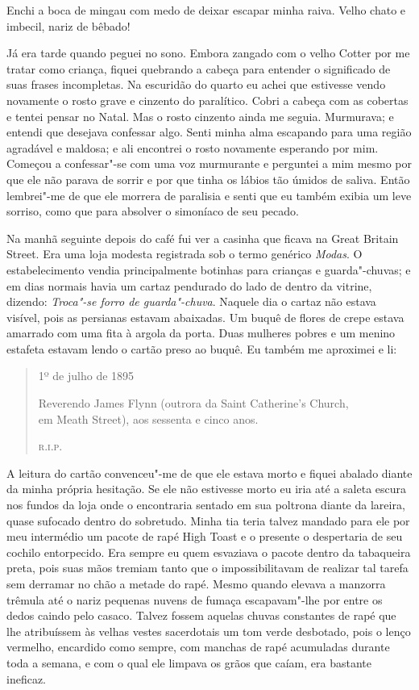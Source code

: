 Enchi a boca de mingau com medo de deixar escapar minha raiva.  Velho chato e
imbecil, nariz de bêbado!

Já era tarde quando peguei no sono.  Embora zangado com o velho Cotter por me
tratar como criança, fiquei quebrando a cabeça para entender o significado de
suas frases incompletas.  Na escuridão do quarto eu achei que estivesse vendo
novamente o rosto grave e cinzento do paralítico.  Cobri a cabeça com as
cobertas e tentei pensar no Natal.  Mas o rosto cinzento ainda me seguia.
Murmurava; e entendi que desejava confessar algo.  Senti minha alma escapando
para uma região agradável e maldosa; e ali encontrei o rosto novamente
esperando por mim.  Começou a confessar"-se com uma voz murmurante e perguntei a
mim mesmo por que ele não parava de sorrir e por que tinha os lábios tão úmidos
de saliva.  Então lembrei"-me de que ele morrera de paralisia e senti que eu
também exibia um leve sorriso, como que para absolver o simoníaco de seu
pecado.

Na manhã seguinte depois do café fui ver a casinha que ficava na Great Britain
Street.  Era uma loja modesta registrada sob o termo genérico \textit{Modas}.
O estabelecimento vendia principalmente botinhas para crianças e guarda"-chuvas;
e em dias normais havia um cartaz pendurado do lado de dentro da vitrine,
dizendo: \textit{Troca"-se forro de guarda"-chuva}.  Naquele dia o cartaz não
estava visível, pois as persianas estavam abaixadas.  Um buquê de flores de
crepe estava amarrado com uma fita à argola da porta.  Duas mulheres pobres e
um menino estafeta estavam lendo o cartão preso ao buquê.  Eu também me
aproximei e li:

\begin{quote}\centering
1º de julho de 1895\smallskip

Reverendo James Flynn (outrora da Saint Catherine’s Church,\\
em Meath Street), aos sessenta e cinco anos.

\scshape r.i.p.
\end{quote}

A leitura do cartão convenceu"-me de que ele estava morto e fiquei abalado
diante da minha própria hesitação.  Se ele não estivesse morto eu iria até a
saleta escura nos fundos da loja onde o encontraria sentado em sua poltrona
diante da lareira, quase sufocado dentro do sobretudo.  Minha tia teria talvez
mandado para ele por meu intermédio um pacote de rapé High Toast e o presente o
despertaria de seu cochilo entorpecido.  Era sempre eu quem esvaziava o pacote
dentro da tabaqueira preta, pois suas mãos tremiam tanto que o impossibilitavam
de realizar tal tarefa sem derramar no chão a metade do rapé.  Mesmo quando
elevava a manzorra trêmula até o nariz pequenas nuvens de fumaça escapavam"-lhe
por entre os dedos caindo pelo casaco.  Talvez fossem aquelas chuvas constantes
de rapé que lhe atribuíssem às velhas vestes sacerdotais um tom verde
desbotado, pois o lenço vermelho, encardido como sempre, com manchas de rapé
acumuladas durante toda a semana, e com o qual ele limpava os grãos que caíam,
era bastante ineficaz.

